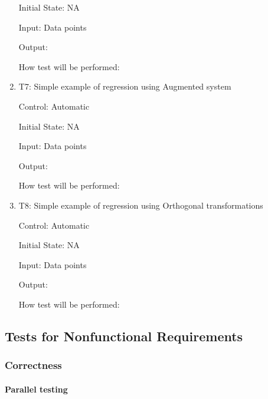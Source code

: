 \documentclass[12pt, titlepage]{article}
\begin{document}
\begin{enumerate}
Initial State: NA

Input: Data points 

Output: 

How test will be performed: 




\item{T7: Simple example of regression using Augmented system\\}

Control: Automatic 

Initial State: NA

Input: Data points 

Output: 

How test will be performed: 




\item{T8: Simple example of regression using Orthogonal transformations\\}

Control: Automatic 

Initial State: NA

Input: Data points 

Output: 

How test will be performed: 


\end{enumerate}
\subsection{Tests for Nonfunctional Requirements}

\subsubsection{Correctness}
		
\paragraph{Parallel testing}
\end{document}
